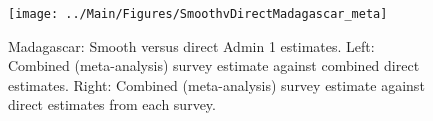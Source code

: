 \documentclass[12pt]{article}\usepackage[]{graphicx}\usepackage[]{color}
\newenvironment{knitrout}{}{} %
\begin{document}

\begin{knitrout}
\color{fgcolor}\begin{figure}[bht]

{\centering \texttt{[image: ../Main/Figures/SmoothvDirectMadagascar\_meta]} 

}

\caption[Madagascar]{Madagascar: Smooth versus direct Admin 1 estimates. Left: Combined (meta-analysis) survey estimate against combined direct estimates. Right: Combined (meta-analysis) survey estimate against direct estimates from each survey.}\label{fig:unnamed-chunk-193}
\end{figure}


\end{knitrout}
\end{document}
